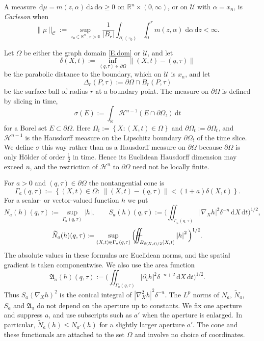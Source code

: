 \documentclass[12pt,leqno]{amsart}
\numberwithin{equation}{section}
\newcommand{\R}{\mathbb R}
\newcommand{\abs}[1]{\left\vert#1\right\vert}
\newcommand{\br}[1]{\left(#1\right)}
\newcommand{\set}[1]{\left\{#1\right\}}
\newcommand{\om}{\Omega}
\newcommand{\pom}{\partial\Omega}
\newcommand{\pd}{\partial}
\newcommand{\Uc}{\mathcal U}
\newcommand{\Cc}{\mathcal C}
\newcommand{\Nt}{\widetilde N}
\newcommand{\Gam}{\Gamma}
\renewcommand{\d}{\,\mathrm d}
\newcommand{\Cnorm}[1]{\|#1\|_{\Cc}}
\def\Yint#1{\mathchoice
	{\YYint\displaystyle\textstyle{#1}}%
	{\YYint\textstyle\scriptstyle{#1}}%
	{\YYint\scriptstyle\scriptscriptstyle{#1}}%
	{\YYint\scriptscriptstyle\scriptscriptstyle{#1}}%
	\!\dint}
\newcommand{\dint}{\int\!\!\!\!\!\int}
\def\YYint#1#2#3{{\setbox0=\hbox{$#1{#2#3}{\iint}$}
		\vcenter{\hbox{$#2#3$}}\kern-.51\wd0}}
\def\longdash{\mkern-1.5mu{-}\mkern-7.5mu{-}}
\def\fiint{\Yint\longdash}
\theoremstyle{plain}
\theoremstyle{remark}
\begin{document}
A measure $\d\mu=m(z,\alpha)\d z\d\alpha\ge0$ on
$\R^n\times(0,\infty)$, or on $\Uc$ with $\alpha=x_n$, is \emph{Carleson}
when
\[
 \Cnorm\mu:=\sup_{z_0\in\R^n,\,r>0}\frac1{\abs{B_r}}
 \int_{B_r(z_0)}\int_0^r m(z,\alpha)\,\d\alpha\d z<\infty.
\]

Let $\om$ be either the graph domain \eqref{E.dom} or $\Uc$, and let
$$\delta(X,t):=\inf_{(q,\tau)\in\pom}\big\|(X,t)-(q,\tau)\big\|$$
be the parabolic distance to the boundary, which on $\Uc$ is $x_n$, and let
\begin{equation}\label{E.surfball}
  \Delta_r(P,\tau):=\pom\cap B_r(P,\tau)
\end{equation}
be the surface ball of radius $r$ at a boundary point. The measure on $\pom$ is
defined by slicing in time,
\begin{equation}\label{E.sigma}
  \sigma(E):=\int_\R\mathcal H^{n-1}\br{E\cap\pom_t}\d t
\end{equation}
for a Borel set $E\subset\pom$. Here
$\om_t:=\set{X:(X,t)\in\om}$ and $\pom_t:=\pd\om_t$, and
$\mathcal H^{n-1}$ is the Hausdorff measure on the Lipschitz boundary
$\pom_t$ of the time slice. We define $\sigma$ this way
rather than as a Hausdorff measure on $\pom$ because $\pom$ is only H\"older of
order $\tfrac12$ in time. Hence its Euclidean Hausdorff dimension may exceed
$n$, and the restriction of $\mathcal H^n$ to $\pom$ need not be locally
finite.\medskip

\noindent For $a>0$ and $(q,\tau)\in\pom$ the nontangential cone is
\begin{equation}\label{E.cone}
  \Gam_a(q,\tau):=\set{(X,t)\in\om:\ \big\|(X,t)-(q,\tau)\big\|
   <(1+a)\delta(X,t)} .
\end{equation}
\noindent For a scalar- or vector-valued function $h$ we put
\begin{equation}\label{E.functionals}
  N_a(h)(q,\tau):=\sup_{\Gam_a(q,\tau)}\abs h,\qquad
  S_a(h)(q,\tau):=\Big(\iint_{\Gam_a(q,\tau)}\abs{\nabla_Xh}^2\delta^{-n}\d X\d t
   \Big)^{1/2},
\end{equation}
\begin{equation}\label{E.Ntilde}
  \Nt_a(h)(q,\tau):=\sup_{(X,t)\in\Gam_a(q,\tau)}
   \Big(\fiint_{B_{\delta(X,t)/2}(X,t)}\abs h^2\Big)^{1/2} .
\end{equation}
The absolute values in these formulas are Euclidean norms, and the spatial
gradient is taken componentwise. We also use the area function
\begin{equation}\label{E.areafun}
 \mathfrak A_a(h)(q,\tau):=
 \Big(\iint_{\Gam_a(q,\tau)}\abs{\pd_th}^2
       \delta^{-n+2}\d X\d t\Big)^{1/2}.
\end{equation}
Thus $S_a(\nabla_Xh)^2$ is the conical integral of
$\abs{\nabla^2_Xh}^2\delta^{-n}$. The $L^p$ norms of $N_a$, $\Nt_a$, $S_a$
and $\mathfrak A_a$ do not depend on the aperture up to constants. We fix one
aperture and suppress $a$, and use subscripts such as $a'$ when the aperture
is enlarged. In particular, $\Nt_a(h)\le N_{a'}(h)$ for a slightly larger
aperture $a'$. The cone and these functionals are attached to the set $\om$
and involve no choice of coordinates.
\end{document}

